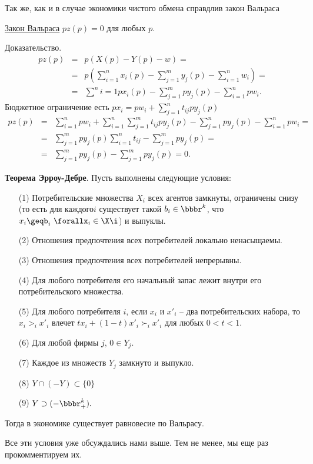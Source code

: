 Так же, как и в случае экономики чистого обмена справдлив закон Вальраса

\underline{Закон Вальраса} $pz(p)=0$ для любых $p$.

Доказательство.
\begin{eqnarray*}
pz(p)&=&p(X(p)-Y(p)-w)=\\
&=&p\left (\sum^n_{i=1}x_i(p)-\sum^m_{j=1}y_j(p)-\sum^n_{i=1}w_i\right )=\\
&=&\sum^n{i=1}px_i(p)-\sum^m_{j=1}py_j(p)-\sum^n_{i=1}pw_i.
\end{eqnarray*}
Бюджетное ограничение есть $px_i=pw_i+\sum^n_{j=1}t_{ij}py_j(p)$
\begin{eqnarray*}
pz(p)&=&\sum^n_{i=1}pw_i+\sum^n_{i=1}\sum^m_{j=1}t_{ij}py_j(p)-\sum^n_{j=1}py_j(p)-\sum^n_{i=1}pw_i=\\
&=&\sum^m_{j=1}py_j(p)\sum^n_{i=1}t_{ij}-\sum^m_{j=1}py_j(p)=\\
&=&\sum^m_{j=1}py_j(p)-\sum^m_{j=1}py_j(p)=0.
\end{eqnarray*}

\textbf{Теорема Эрроу-Дебре}.  Пусть выполнены следующие условия:
\begin{itemize}
\item[(1)] Потребительские множества $X_i$ всех агентов замкнуты, ограничены снизу
(то есть для каждого$i$ существует такой $b_i\in\bbbr^k$, что
$x_i\geqb_i\,\,\forallx_i\in\X\i$) и выпуклы.
\item[(2)] Отношения предпочтения всех потребителей локально ненасыщаемы.
\item[(3)] Отношения предпочтения всех потребителей непрерывны.
\item[(4)] Для любого потребителя его начальный запас лежит внутри его потребительского
множества.
\item[(5)] Для любого потребителя $i$, если $x_i$ и $x'_i$ -- два
потребительских набора, то $x_i>_ix'_i$ влечет
$tx_i+(1-t)x'_i\succ_ix'_i$ для любых $0<t<1$.
\item[(6)] Для любой фирмы $j$, $0\in Y_j.$
\item[(7)] Каждое из множеств $Y_j$ замкнуто и выпукло.
\item[(8)] $Y\cap (-Y)\subset\{0\}$
\item[(9)]  $Y\supset (-\bbbr^k_+).$
\end{itemize}
Тогда в экономике существует равновесие по Вальрасу.

Все эти условия уже обсуждались нами выше. Тем не менее, мы еще
раз прокомментируем их.

